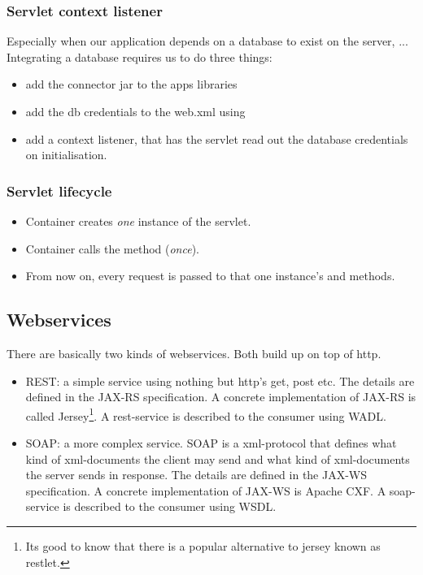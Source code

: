 \subsubsection{Servlet context listener}
Especially when our application depends on a database to exist on the server, ...
Integrating a database requires us to do three things: 
\begin{itemize}
    \item add the connector jar to the apps libraries
    \item add the db credentials to the web.xml using 
    \item add a context listener, that has the servlet read out the database credentials on initialisation.
\end{itemize}

\subsubsection{Servlet lifecycle}
\begin{itemize}
    \item Container creates \emph{one} instance of the servlet. 
    \item Container calls the  method (\emph{once}).
    \item From now on, every request is passed to that one instance's  and  methods.
\end{itemize}


\subsection{Webservices}

There are basically two kinds of webservices. Both build up on top of http.

\begin{itemize}
    \item REST: a simple service using nothing but http's get, post etc. The details are defined in the JAX-RS specification. A concrete implementation of JAX-RS is called Jersey\footnote{Its good to know that there is a popular alternative to jersey known as restlet.}. A rest-service is described to the consumer using WADL. 
    \item SOAP: a more complex service. SOAP is a xml-protocol that defines what kind of xml-documents the client may send and what kind of xml-documents the server sends in response. The details are defined in the JAX-WS specification. A concrete implementation of JAX-WS is Apache CXF. A soap-service is described to the consumer using WSDL. 
\end{itemize}

